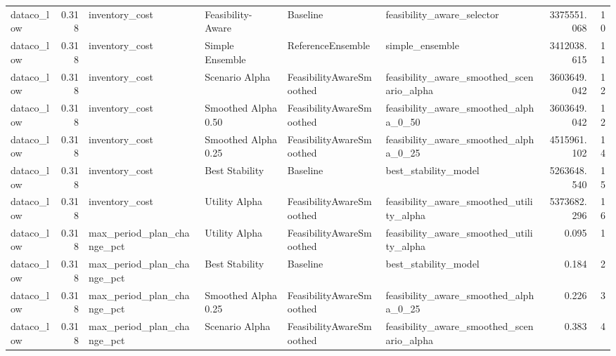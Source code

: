 \begin{table}
{\begin{tabular}{lrllllrr}
    dataco\_low &             0.318 &              inventory\_cost &     Feasibility-Aware &                  Baseline &                         feasibility\_aware\_selector &   3375551.068 &              10 \\
    dataco\_low &             0.318 &              inventory\_cost &       Simple Ensemble &         ReferenceEnsemble &                                    simple\_ensemble &   3412038.615 &              11 \\
    dataco\_low &             0.318 &              inventory\_cost &        Scenario Alpha &  FeasibilityAwareSmoothed &          feasibility\_aware\_smoothed\_scenario\_alpha &   3603649.042 &              12 \\
    dataco\_low &             0.318 &              inventory\_cost &   Smoothed Alpha 0.50 &  FeasibilityAwareSmoothed &              feasibility\_aware\_smoothed\_alpha\_0\_50 &   3603649.042 &              12 \\
    dataco\_low &             0.318 &              inventory\_cost &   Smoothed Alpha 0.25 &  FeasibilityAwareSmoothed &              feasibility\_aware\_smoothed\_alpha\_0\_25 &   4515961.102 &              14 \\
    dataco\_low &             0.318 &              inventory\_cost &        Best Stability &                  Baseline &                               best\_stability\_model &   5263648.540 &              15 \\
    dataco\_low &             0.318 &              inventory\_cost &         Utility Alpha &  FeasibilityAwareSmoothed &           feasibility\_aware\_smoothed\_utility\_alpha &   5373682.296 &              16 \\
    dataco\_low &             0.318 &  max\_period\_plan\_change\_pct &         Utility Alpha &  FeasibilityAwareSmoothed &           feasibility\_aware\_smoothed\_utility\_alpha &         0.095 &               1 \\
    dataco\_low &             0.318 &  max\_period\_plan\_change\_pct &        Best Stability &                  Baseline &                               best\_stability\_model &         0.184 &               2 \\
    dataco\_low &             0.318 &  max\_period\_plan\_change\_pct &   Smoothed Alpha 0.25 &  FeasibilityAwareSmoothed &              feasibility\_aware\_smoothed\_alpha\_0\_25 &         0.226 &               3 \\
    dataco\_low &             0.318 &  max\_period\_plan\_change\_pct &        Scenario Alpha &  FeasibilityAwareSmoothed &          feasibility\_aware\_smoothed\_scenario\_alpha &         0.383 &               4 \\

\end{tabular}}
\end{table}
